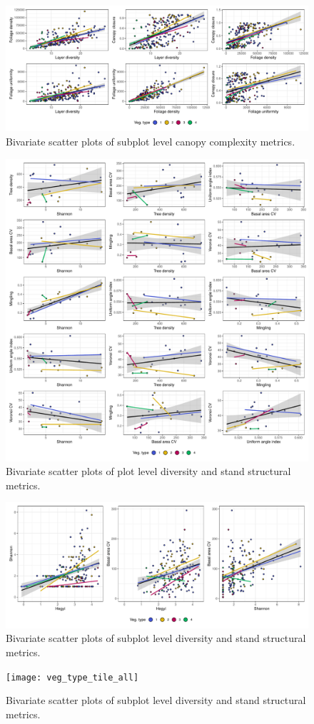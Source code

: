 \documentclass[11pt,a4paper]{article}
\begin{document}
\begin{figure}
	\includegraphics[width=\linewidth]{canopy_metric_comp_subplot}
	\caption{Bivariate scatter plots of subplot level canopy complexity metrics.}
	\label{canopy_metric_comp_subplot}
\end{figure}

\begin{figure}
	\includegraphics[width=\linewidth]{pred_comp_plot}
	\caption{Bivariate scatter plots of plot level diversity and stand structural metrics.}
	\label{pred_comp_plot}
\end{figure}

\begin{figure}
	\includegraphics[width=\linewidth]{pred_comp_subplot}
	\caption{Bivariate scatter plots of subplot level diversity and stand structural metrics.}
	\label{pred_comp_subplot}
\end{figure}

\begin{figure}
	\texttt{[image: veg\_type\_tile\_all]}
	\caption{Bivariate scatter plots of subplot level diversity and stand structural metrics.}
	\label{veg_type_tile_all}
\end{figure}


\end{document}
